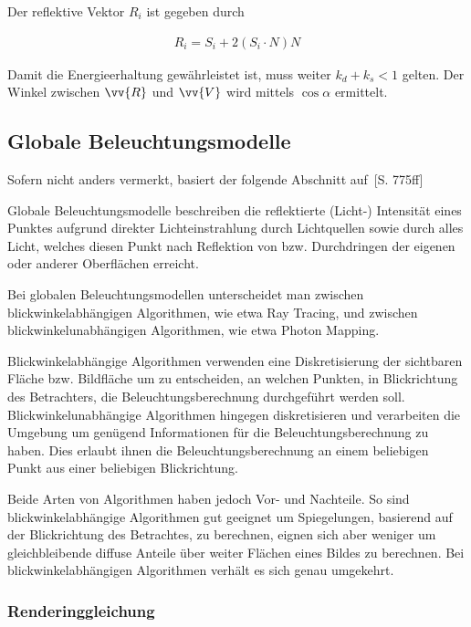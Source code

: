Der reflektive Vektor $R_{i}$ ist gegeben durch

\begin{gather}
    R_{i} = S_{i} + 2(S_{i} \cdot N)N
\end{gather}

Damit die Energieerhaltung gewährleistet ist, muss weiter $k_{d} + k_{s} < 1$
gelten. Der Winkel zwischen $\vv{R}$ und $\vv{V}$ wird mittels $\cos{\alpha}$
ermittelt.


\subsection{Globale Beleuchtungsmodelle}
\label{subsec:global_illumination_models}

Sofern nicht anders vermerkt, basiert der folgende Abschnitt auf~\cite{foley_computer_1996}[S. 775ff]

Globale Beleuchtungsmodelle beschreiben die reflektierte (Licht-) Intensität
eines Punktes aufgrund direkter Lichteinstrahlung durch Lichtquellen sowie
durch alles Licht, welches diesen Punkt nach Reflektion von bzw. Durchdringen
der eigenen oder anderer Oberflächen erreicht.

Bei globalen Beleuchtungsmodellen unterscheidet man zwischen
blickwinkelabhängigen Algorithmen, wie etwa Ray Tracing, und zwischen
blickwinkelunabhängigen Algorithmen, wie etwa Photon Mapping.

Blickwinkelabhängige Algorithmen verwenden eine Diskretisierung der sichtbaren
Fläche bzw. Bildfläche um zu entscheiden, an welchen Punkten, in Blickrichtung
des Betrachters, die Beleuchtungsberechnung durchgeführt werden soll.
Blickwinkelunabhängige Algorithmen hingegen diskretisieren und verarbeiten die
Umgebung um genügend Informationen für die Beleuchtungsberechnung zu haben.
Dies erlaubt ihnen die Beleuchtungsberechnung an einem beliebigen Punkt aus
einer beliebigen Blickrichtung.

Beide Arten von Algorithmen haben jedoch Vor- und Nachteile. So sind
blickwinkelabhängige Algorithmen gut geeignet um Spiegelungen, basierend auf
der Blickrichtung des Betrachtes, zu berechnen, eignen sich aber weniger um
gleichbleibende diffuse Anteile über weiter Flächen eines Bildes zu berechnen.
Bei blickwinkelabhängigen Algorithmen verhält es sich genau umgekehrt.

\subsubsection{Renderinggleichung}
\label{ssubsec:rendering_equation}

